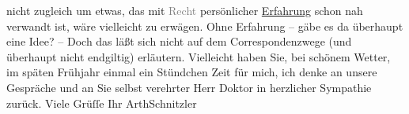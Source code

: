 \begin{ledgroupsized}[t]{13cm}
                    nicht zugleich um etwas, das mit \textcolor{gray}{Recht} persönlicher \uline{Erfahrung} schon nah verwandt ist, wäre
                    vielleicht zu erwägen. Ohne Erfahrung – gäbe es da{\geminationn}
                    überhaupt eine Idee? – Doch das läßt {\pb}sich nicht auf dem
                    Correspondenzwege (und überhaupt nicht endgiltig) erläutern. Vielleicht haben
                    Sie, bei schönem Wetter, im späten Frühjahr einmal ein Stündchen Zeit für mich,
                    ich denke an unsere Gespräche und an Sie selbst verehrter Herr Doktor in
                    herzlicher Sympathie zurück.\pend
           \pstart Viele Grüſſe Ihr \spacefill\mbox{ArthSchnitzler}\pend{}
         
         \endnumbering{}\end{ledgroupsized}  \newcommand{\dateiname}{L02484}\newcommand{\titel}{Arthur Schnitzler an Robert Adam, 9. 4. 1927}\newcommand{\editorInnen}{Martin Anton Müller und Gerd-Hermann Susen}
      